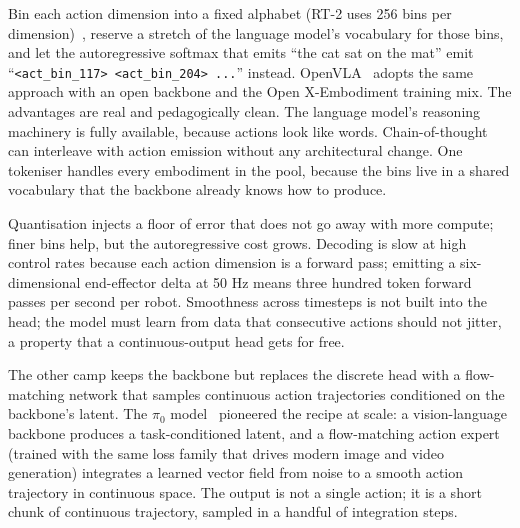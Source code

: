  Bin each action dimension into a fixed alphabet (RT-2 uses 256 bins per dimension)~\cite{Brohan2023RT2}, reserve a stretch of the language model's vocabulary for those bins, and let the autoregressive softmax that emits ``the cat sat on the mat'' emit ``\texttt{<act\_bin\_117> <act\_bin\_204> ...}'' instead. OpenVLA~\cite{Kim2024OpenVLA} adopts the same approach with an open backbone and the Open X-Embodiment training mix. The advantages are real and pedagogically clean. The language model's reasoning machinery is fully available, because actions look like words. Chain-of-thought can interleave with action emission without any architectural change. One tokeniser handles every embodiment in the pool, because the bins live in a shared vocabulary that the backbone already knows how to produce.


 Quantisation injects a floor of error that does not go away with more compute; finer bins help, but the autoregressive cost grows. Decoding is slow at high control rates because each action dimension is a forward pass; emitting a six-dimensional end-effector delta at 50 Hz means three hundred token forward passes per second per robot. Smoothness across timesteps is not built into the head; the model must learn from data that consecutive actions should not jitter, a property that a continuous-output head gets for free.

 The other camp keeps the backbone but replaces the discrete head with a flow-matching network that samples continuous action trajectories conditioned on the backbone's latent. The $\pi_0$ model~\cite{Black2024Pi0} pioneered the recipe at scale: a vision-language backbone produces a task-conditioned latent, and a flow-matching action expert (trained with the same loss family that drives modern image and video generation) integrates a learned vector field from noise to a smooth action trajectory in continuous space. The output is not a single action; it is a short chunk of continuous trajectory, sampled in a handful of integration steps.

